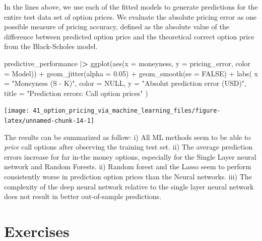\documentclass[
]{krantz}
\newenvironment{Shaded}{\begin{snugshade}}{\end{snugshade}}
\newcommand{\AttributeTok}[1]{\textcolor[rgb]{0.61,0.61,0.61}{#1}}
\newcommand{\ConstantTok}[1]{\textcolor[rgb]{0,0,0}{#1}}
\newcommand{\ErrorTok}[1]{\textcolor[rgb]{0.14,0.14,0.14}{\textbf{#1}}}
\newcommand{\FloatTok}[1]{\textcolor[rgb]{0.06,0.06,0.06}{#1}}
\newcommand{\FunctionTok}[1]{\textcolor[rgb]{0,0,0}{#1}}
\newcommand{\NormalTok}[1]{#1}
\newcommand{\SpecialCharTok}[1]{\textcolor[rgb]{0,0,0}{#1}}
\newcommand{\StringTok}[1]{\textcolor[rgb]{0.5,0.5,0.5}{#1}}
\begin{document}
In the lines above, we use each of the fitted models to generate predictions for the entire test data set of option prices. We evaluate the absolute pricing error as one possible measure of pricing accuracy, defined as the absolute value of the difference between predicted option price and the theoretical correct option price from the Black-Scholes model.

\begin{Shaded}
\begin{Highlighting}[]
\NormalTok{predictive\_performance }\SpecialCharTok{|}\ErrorTok{\textgreater{}}
  \FunctionTok{ggplot}\NormalTok{(}\FunctionTok{aes}\NormalTok{(}\AttributeTok{x =}\NormalTok{ moneyness, }\AttributeTok{y =}\NormalTok{ pricing\_error, }\AttributeTok{color =}\NormalTok{ Model)) }\SpecialCharTok{+}
  \FunctionTok{geom\_jitter}\NormalTok{(}\AttributeTok{alpha =} \FloatTok{0.05}\NormalTok{) }\SpecialCharTok{+}
  \FunctionTok{geom\_smooth}\NormalTok{(}\AttributeTok{se =} \ConstantTok{FALSE}\NormalTok{) }\SpecialCharTok{+}
  \FunctionTok{labs}\NormalTok{(}
    \AttributeTok{x =} \StringTok{"Moneyness (S {-} K)"}\NormalTok{, }\AttributeTok{color =} \ConstantTok{NULL}\NormalTok{,}
    \AttributeTok{y =} \StringTok{"Absolut prediction error (USD)"}\NormalTok{,}
    \AttributeTok{title =} \StringTok{"Prediction errors: Call option prices"}
\NormalTok{  )}
\end{Highlighting}
\end{Shaded}

\begin{center}\texttt{[image: 41\_option\_pricing\_via\_machine\_learning\_files/figure-latex/unnamed-chunk-14-1]} \end{center}

The results can be summarized as follow: i) All ML methods seem to be able to \emph{price} call options after observing the training test set. ii) The average prediction errors increase for far in-the money options, especially for the Single Layer neural network and Random Forests. ii) Random forest and the Lasso seem to perform consistently worse in prediction option prices than the Neural networks. iii) The complexity of the deep neural network relative to the single layer neural network does not result in better out-of-sample predictions.

\hypertarget{exercises-8}{%
\section{Exercises}\label{exercises-8}}
\end{document}
